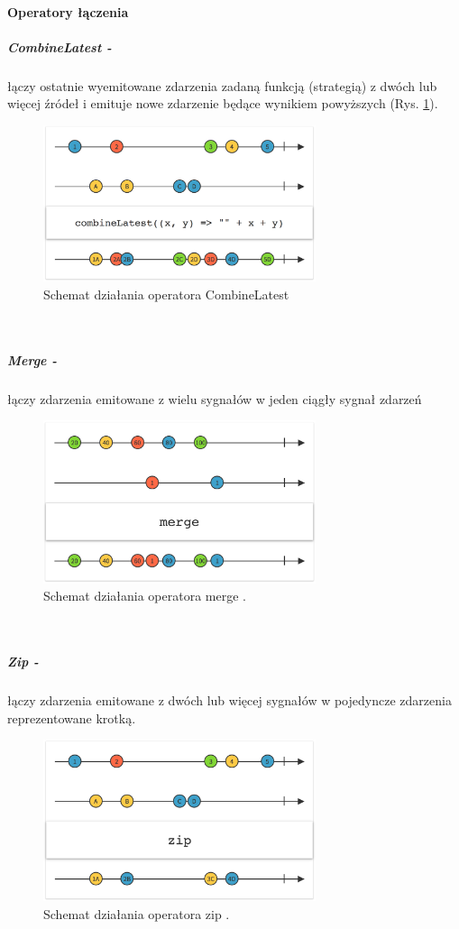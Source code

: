 \documentclass[12pt,oneside,a4paper]{report}
\begin{document}
\paragraph{Operatory łączenia}
\subparagraph{CombineLatest -}łączy ostatnie wyemitowane zdarzenia zadaną funkcją (strategią) z dwóch lub więcej źródeł i emituje nowe zdarzenie będące wynikiem powyższych (Rys. \ref{combineLatest}). 
\begin{figure}[ht!]
	\centering
	\includegraphics[width=8cm]{combinelatest}
	\caption{Schemat działania operatora CombineLatest\cite{marbles}}
	\label{combineLatest}
\end{figure}\\
\subparagraph{Merge -}łączy zdarzenia emitowane z wielu sygnałów w jeden ciągły sygnał zdarzeń
\begin{figure}[ht!]
	\centering
	\includegraphics[width=8cm]{merge}
	\caption{Schemat działania operatora merge \cite{marbles}.}
	\label{merge}
\end{figure}\\
\subparagraph{Zip -}łączy zdarzenia emitowane z dwóch lub więcej sygnałów w pojedyncze zdarzenia reprezentowane krotką. 
\begin{figure}[ht!]
	\centering
	\includegraphics[width=8cm]{zip}
	\caption{Schemat działania operatora zip \cite{zip}.}
	\label{zip}
\end{figure}\\
\end{document}
